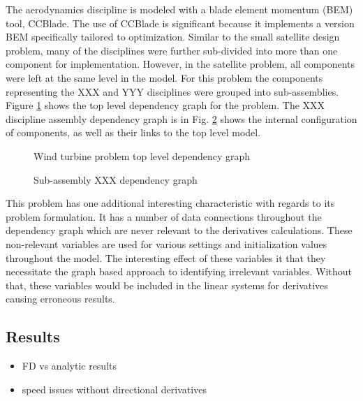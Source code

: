 \documentclass[]{aiaa-tc} %
\begin{document}
    The aerodynamics discipline is modeled with a blade element
    momentum (BEM) tool, CCBlade\cite{NING:BEM}. The use of CCBlade is significant because
    it implements a version BEM specifically tailored to optimization.
    Similar to the small satellite design problem, many of the disciplines were further
    sub-divided into more than one component for implementation. However, in the
    satellite problem, all components were left at the same level in the model. For this
    problem the components representing the XXX and YYY disciplines were
    grouped into sub-assemblies. Figure \ref{fig:wt_top_depgraph} shows the
    top level dependency graph for the problem. The XXX discipline assembly dependency
    graph is in Fig. \ref{fig:wt_sub_depgraph} shows the internal configuration
    of components, as well as their links to the top level model.

    \begin{figure}[!htbp]
        \caption{Wind turbine problem top level dependency graph}
        \label{fig:wt_top_depgraph}
    \end{figure}

    \begin{figure}[!htbp]
        \caption{Sub-assembly XXX dependency graph}
        \label{fig:wt_sub_depgraph}
    \end{figure}


    This problem has one additional interesting characteristic with regards to its
    problem formulation. It has a number of data connections throughout the dependency
    graph which are never relevant to the derivatives calculations. These non-relevant
    variables are used for various settings and initialization values throughout the
    model. The interesting effect of these variables it that they necessitate the
    graph based approach to identifying irrelevant variables. Without that, these
    variables would be included in the linear systems for derivatives causing erroneous
    results.


    \subsection{Results}
        \begin{itemize}
            \item FD vs analytic results
            \item speed issues without directional derivatives
        \end{itemize}
\end{document}
